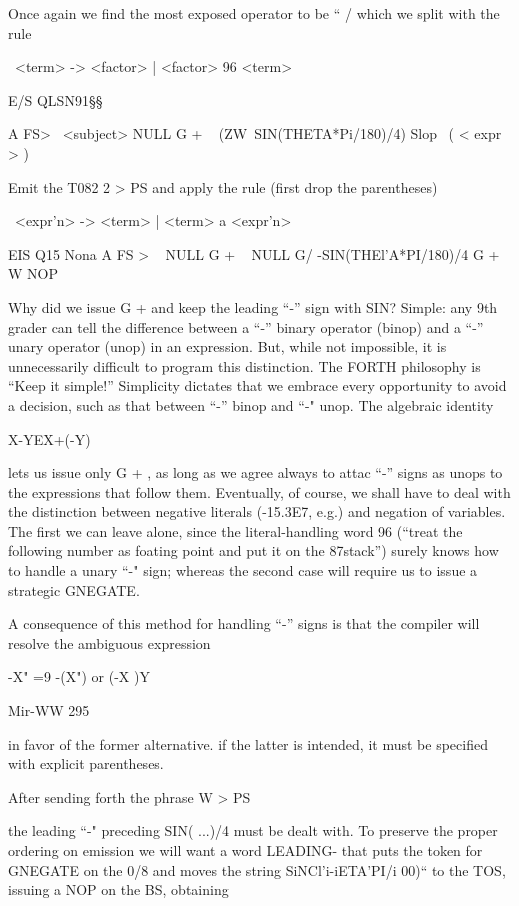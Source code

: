 Once again we find the most exposed operator to be “ / which
we split with the rule

\ <term> -> <factor> | <factor> 96 <term>

E/S QLSN91§§

A FS> \ <subject>
NULL G + \ < term >
(ZW~SIN(THETA*Pi/180)/4) Slop \ ( < expr > )


Emit the T082
2 > PS
and apply the rule (first drop the parentheses)

\ <expr'n> -> <term> | <term> a <expr'n>

EIS Q15 Nona
A FS > \ < subject >
NULL G + \ < term >
NULL G/
-SIN(THEl'A*PI/180)/4 G +
W NOP

Why did we issue G + and keep the leading “-” sign with SIN?
Simple: any 9th grader can tell the difference between a “-”
binary operator (binop) and a “-” unary operator (unop) in an
expression. But, while not impossible, it is unnecessarily difficult
to program this distinction. The FORTH philosophy is “Keep it
simple!” Simplicity dictates that we embrace every opportunity
to avoid a decision, such as that between “-” binop and “-" unop.
The algebraic identity

X-YEX+(-Y)

lets us issue only G + , as long as we agree always to attac “-”
signs as unops to the expressions that follow them. Eventually,
of course, we shall have to deal with the distinction between
negative literals (-15.3E7, e.g.) and negation of variables. The
first we can leave alone, since the literal-handling word 96 (“treat
the following number as foating point and put it on the 87stack”)
surely knows how to handle a unary “-" sign; whereas the second
case will require us to issue a strategic GNEGATE.

A consequence of this method for handling “-” signs is that the
compiler will resolve the ambiguous expression

-X" =9 -(X") or (-X )Y

Mir-WW 295

in favor of the former alternative. if the latter is intended, it must
be specified with explicit parentheses.

After sending forth the phrase
W > PS

the leading “-" preceding SIN( ...)/4 must be dealt with. To
preserve the proper ordering on emission we will want a word
LEADING- that puts the token for GNEGATE on the 0/8 and
moves the string SiNCl'i-iETA'PI/i 00)“ to the TOS, issuing a
NOP on the BS, obtaining

